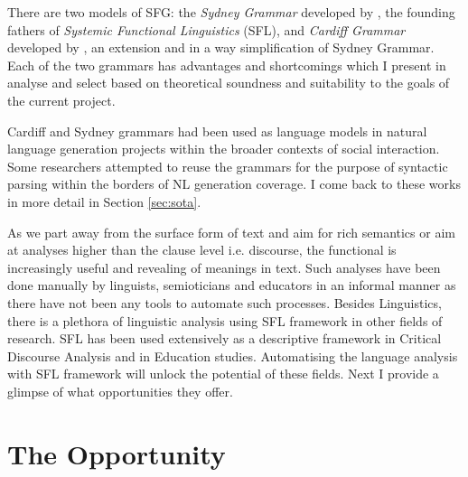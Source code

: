 
% 
There are two models of SFG: the \textit{Sydney Grammar} developed by \citet{Halliday2013}, the founding fathers of \textit{Systemic Functional Linguistics} (SFL), and \textit{Cardiff Grammar} developed by \citet{Fawcett2008}, an extension and in a way simplification of Sydney Grammar. Each of the two grammars has advantages and shortcomings which I present in analyse and select based on theoretical soundness and suitability to the goals of the current project.

Cardiff and Sydney grammars had been used as language models in natural language generation projects within 
the broader contexts of social interaction. Some researchers \citep{Kasper1988, ODonoghue1991a, ODonnell1993, Souter1996, Day2007} attempted to reuse the grammars for the purpose of syntactic parsing within the borders of NL generation coverage. I come back to these works in more detail in Section \ref{sec:sota}.

As we part away from the surface form of text and aim for rich semantics or aim at analyses higher than the clause level i.e. discourse, the functional is increasingly useful and revealing of meanings in text. Such analyses have been done manually by linguists, semioticians and educators in an informal manner as there have not been any tools to automate such processes. Besides Linguistics, there is a plethora of linguistic analysis using SFL framework in other fields of research. SFL has been used extensively as a descriptive framework in Critical Discourse Analysis and in Education studies. Automatising the language analysis with SFL framework will unlock the potential of these fields. Next I provide a glimpse of what opportunities they offer. 

\section{The Opportunity}

